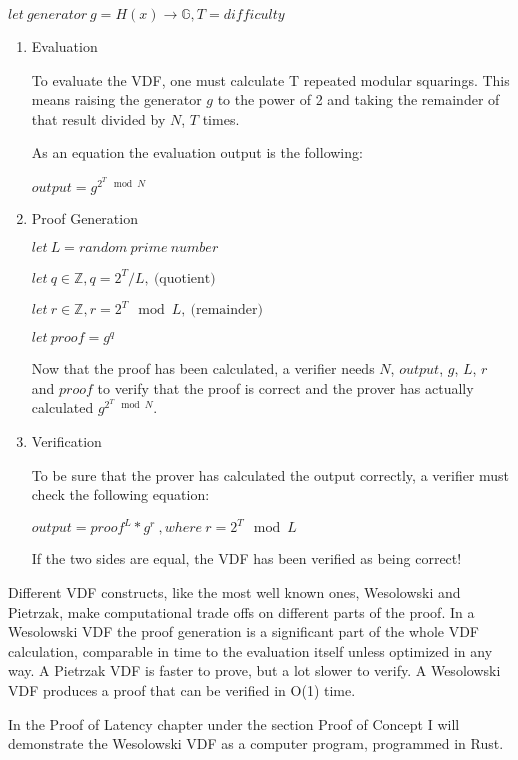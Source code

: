 \( let \: generator \: g = H(x) \to \mathbb{G}, T = difficulty \)
\begin{enumerate}
	\item{Evaluation}

	      To evaluate the VDF, one must calculate T repeated modular squarings. This means raising the generator $g$ to the power of 2 and taking the remainder of that result divided by $N$, $T$ times.

	      As an equation the evaluation output is the following:

	      \( output = g^{2^{T} \mod N } \)

	\item{Proof Generation}

	      \( let \: L = random \: prime \: number \)

	      \( let \: q \in \mathbb{Z}, q = 2^T/L, \: \text{(quotient)} \)

	      \( let \: r \in \mathbb{Z}, r = 2^T\mod L, \: \text{(remainder)} \)

	      \( let \: proof = g^q \)

	      Now that the proof has been calculated, a verifier needs $N$, $output$, $g$, $L$, $r$ and $proof$ to verify that the proof is correct and the prover has actually calculated $g^{2^{T} \mod N }$.

	\item{Verification}

	      To be sure that the prover has calculated the output correctly, a verifier must check the following equation:

	      \( output = proof^L * g^r \:, where \: r = 2^T \mod L \)

	      If the two sides are equal, the VDF has been verified as being correct!
\end{enumerate}

Different VDF constructs, like the most well known ones, Wesolowski and Pietrzak, make computational trade offs on different parts of the proof. In a Wesolowski VDF the proof generation is a significant part of the whole VDF calculation, comparable in time to the evaluation itself unless optimized in any way. A Pietrzak VDF is faster to prove, but a lot slower to verify. A Wesolowski VDF produces a proof that can be verified in O(1) time.

In the Proof of Latency chapter under the section Proof of Concept I will demonstrate the Wesolowski VDF as a computer program, programmed in Rust.

